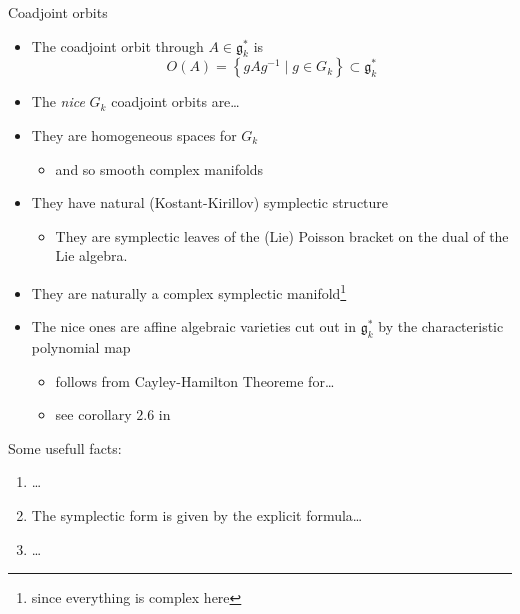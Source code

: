\begin{frame}{Coadjoint orbits}
  \begin{defn}
    \begin{itemize}
      \item The coadjoint orbit through $A\in\mathfrak{g}_k^*$ is
        \[
          O(A)=\left\{gAg^{-1}\mid g\in G_k\right\}\subset\mathfrak{g}_k^*
        \]
      \item The \emph{nice} $G_k$ coadjoint orbits are\dots
    \end{itemize}
  \end{defn}
  \begin{itemize}
    \item They are homogeneous spaces for $G_k$
    \begin{itemize}
      \item and so smooth complex manifolds
    \end{itemize}
    \item They have natural (Kostant-Kirillov) symplectic structure
    \begin{itemize}
      \item They are symplectic leaves of the (Lie) Poisson bracket on the dual
      of the Lie algebra.
    \end{itemize}
    \item They are naturally a complex symplectic manifold\footnote{since
    everything is complex here}
    \item The nice ones are affine algebraic varieties cut out in
    $\mathfrak{g}_k^*$ by the characteristic polynomial map
    \begin{itemize}
      \item follows from Cayley-Hamilton Theoreme for\dots
      \item see corollary $2.6$ in \cite{thboalch}
    \end{itemize}
  \end{itemize}
  Some usefull facts:
  \begin{lem}
    \begin{enumerate}
      \item\dots
      \item The symplectic form is given by the explicit formula\dots
      \item\dots
    \end{enumerate}
  \end{lem}
\end{frame}

